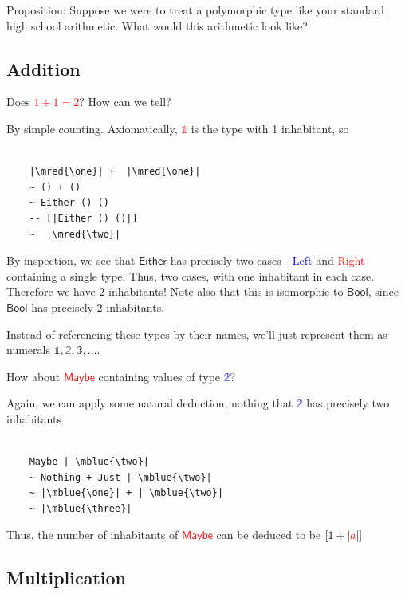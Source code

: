 \documentclass[tikz]{beamer}
\newcommand{\cat}[1]{\bm{ \mathsf{#1} }}
\newcommand{\one}{\bm{\mathbb{1}}}
\newcommand{\two}{\bm{\mathbb{2}}}
\newcommand{\three}{\bm{\mathbb{3}}}
\newcommand{\red}[1]{\textcolor{red}{#1}}
\newcommand{\mred}[1]{\textcolor{red}{$#1$}}
\newcommand{\blue}[1]{\textcolor{blue}{#1}}
\newcommand{\mblue}[1]{\textcolor{blue}{$#1$}}
\theoremstyle{definition}
\begin{document}
\frame
{ 
	Proposition: Suppose we were to treat a polymorphic type like your standard high school arithmetic. What would this arithmetic look like? 
}

\subsection{Addition}

\frame
{ 
	Does \mred{1 + 1 = 2}? How can we tell? 
}

\begin{frame}[fragile]
	By simple counting. Axiomatically, \mred{\one} is the type with 1 inhabitant, so
	\begin{verbatim}
	
	|\mred{\one}| +  |\mred{\one}|
	~ () + ()
	~ Either () ()
	-- [|Either () ()|]
	~  |\mred{\two}|
	\end{verbatim}
	
\end{frame}

\frame
{ 
	By inspection, we see that $\cat{Either}$ has precisely two cases - \blue{Left} and \red{Right} containing a single type. Thus, two cases, with one inhabitant in each case. Therefore we have 2 inhabitants! Note also that this is isomorphic to $\cat{Bool}$, since $\cat{Bool}$ has precisely 2 inhabitants. 
}

\frame
{
	Instead of referencing these types by their names, we'll just represent them as numerals $\one, \two, \three, \ldots$. 
}

\frame
{ 
	How about \mred{\cat{Maybe}} containing values of type \mblue{\two}? 
}

\begin{frame}[fragile]

Again, we can apply some natural deduction, nothing that  \mblue{\two} has precisely two inhabitants
	\begin{verbatim}
	
	Maybe | \mblue{\two}|
	~ Nothing + Just | \mblue{\two}|
	~ |\mblue{\one}| + | \mblue{\two}|
	~ |\mblue{\three}| 
	\end{verbatim}
\end{frame}

\frame
{
	Thus, the number of inhabitants of \mred{\cat{Maybe}} can be deduced to be $[1 + |\red{a}|]$
}

\subsection{Multiplication}
\end{document}
